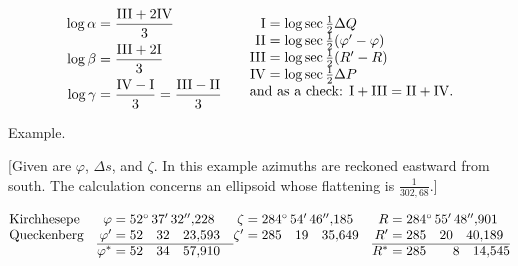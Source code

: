 \par\clearpage
\noindent{}\makebox[12mm][r]{}\par\medskip

\[
\begin{array}{@{}l@{\qquad}l@{}}
\begin{aligned}[t]
\log\alpha&=\frac{\mathrm{III}+2\mathrm{IV}}3\\[.4ex]
\log\beta&=\frac{\mathrm{III}+2\mathrm I}3\\[.4ex]
\log\gamma&=\frac{\mathrm{IV}-\mathrm I}3=\frac{\mathrm{III}-\mathrm{II}}3
\end{aligned}
&
\begin{array}[t]{@{}r@{\;}l@{}}
\mathrm{I}&=\log\sec\tfrac12\Delta Q\\
\mathrm{II}&=\log\sec\tfrac12(\varphi'-\varphi)\\
\mathrm{III}&=\log\sec\tfrac12(R'-R)\\
\mathrm{IV}&=\log\sec\tfrac12\Delta P\\
\multicolumn{2}{@{}l@{}}{\text{and as a check: }\mathrm I+\mathrm{III}=\mathrm{II}+\mathrm{IV}.}
\end{array}
\end{array}
\]

\begin{center}Example.\end{center}
[Given are \(\varphi\), \(\Delta s\), and \(\zeta\). In this example azimuths are
reckoned eastward from south. The calculation concerns an ellipsoid whose
flattening is \(\frac1{302{,}68}\).]

\[
\begin{array}{@{}l@{\quad}r@{\;}l@{\quad}r@{\;}l@{\quad}r@{\;}l@{}}
\text{Kirchhesepe}&\varphi=&52^\circ\,37'\,32''{,}228&
\zeta=&284^\circ\,54'\,46''{,}185&R=&284^\circ\,55'\,48''{,}901\\
\text{Queckenberg}&\varphi'=&52\quad32\quad23{,}593&
\zeta'=&285\quad19\quad35{,}649&R'=&285\quad20\quad40{,}189\\
\cline{2-3}\cline{6-7}
&\varphi^*=&52\quad34\quad57{,}910&&&R^*=&285\qquad8\quad14{,}545
\end{array}
\]

